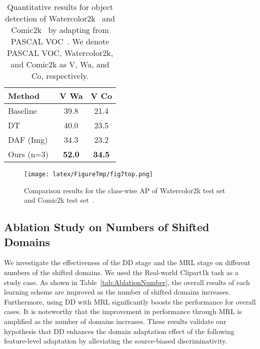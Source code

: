 \documentclass[10pt,twocolumn,letterpaper]{article}
\begin{document}
\begin{table}
\small
\begin{center}
\begin{tabular}{|l|c|c|}
\hline
Method          & V  Wa & V  Co  \\ \hline\hline
Baseline  & 39.8 & 21.4 \\ \hline
DT~\cite{Inoue_2018_CVPR}      & 40.0 & 23.5 \\ \hline
DAF (Img)~\cite{Chen_2018_CVPR}&  34.3 & 23.2 \\ \hline
Ours (n=3)      & {\bf 52.0} & {\bf 34.5} \\ \hline
\end{tabular}
\end{center}
\caption{Quantitative results for object detection of Watercolor2k~\cite{Inoue_2018_CVPR} and Comic2k~\cite{Inoue_2018_CVPR} by adapting from PASCAL VOC~\cite{PascalVoc}. We denote PASCAL VOC, Watercolor2k, and Comic2k as V, Wa, and Co, respectively.}
\label{tab:WatCom2k}
\end{table}
\begin{figure}[t]
\begin{center}
\centering

\texttt{[image: latex/FigureTmp/fig7top.png]}
\vskip -7pt
    \label{fig:7b}
  \vskip -3pt
\end{center}
  \caption{Comparison results for the class-wise AP of Watercolor2k test set and Comic2k test set~\cite{Inoue_2018_CVPR}.}
\label{fig:Classwise}
\end{figure}



\subsection{Ablation Study on Numbers of Shifted Domains}
We investigate the effectiveness of the DD stage and the MRL stage on different numbers of the shifted domains.
We used the Real-world  Clipart1k task as a study case.
As shown in Table~\ref{tab:AblationNumber}, the overall results of each learning scheme are improved as the number of shifted domains increases.
Furthermore, using DD with MRL significantly boosts the performance for overall cases.
It is noteworthy that the improvement in performance through MRL is amplified as the number of domains increases.
These results validate our hypothesis that DD enhances the domain adaptation effect of the following feature-level adaptation by alleviating the source-biased discriminativity.
\end{document}
